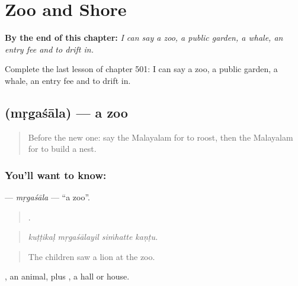 
\chapter{Zoo and Shore}
\label{ch:ml-zoo-and-shore}

\begin{chapteropening}
\textbf{By the end of this chapter:} \emph{I can say a zoo, a public garden, a whale, an entry fee and to drift in.}

Complete the last lesson of chapter 501: I can say a zoo, a public garden, a whale, an entry fee and to drift in.
\end{chapteropening}

\section[\texorpdfstring{\ml{മൃഗശാല} (mṛgaśāla)}{മൃഗശാല (mṛgaśāla)}]{ (mṛgaśāla) — a zoo}

\label{lesson:ML-C501-mrgasala}



\begin{quote}
Before the new one: say the Malayalam for to roost, then the Malayalam for to build a nest.
\end{quote}

\subsection*{You'll want to know: }
\textbf{} — \emph{mṛgaśāla} — \textquotedblleft{}a zoo\textquotedblright{}.

\begin{quote}
   .
\end{quote}

\begin{quote}
\emph{kuṭṭikaḷ mṛgaśālayil siṁhatte kaṇṭu.}
\end{quote}

\begin{quote}
The children saw a lion at the zoo.
\end{quote}

, an animal, plus , a hall or house.

